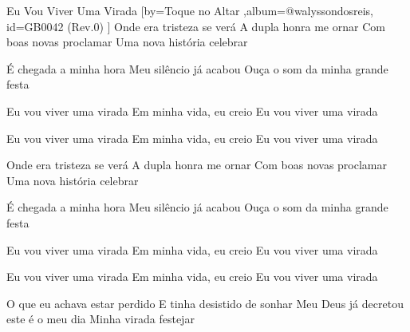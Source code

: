 \beginsong
{Eu Vou Viver Uma Virada %
}[by={Toque no Altar %
},album={@walyssondosreis},
id={GB0042 %
(Rev.0) %
}]
Onde era tristeza se verá
A dupla honra me ornar
Com boas novas proclamar
Uma nova história celebrar

É chegada a minha hora
Meu silêncio já acabou
Ouça o som da minha grande festa

Eu vou viver uma virada
Em minha vida, eu creio
Eu vou viver uma virada

Eu vou viver uma virada
Em minha vida, eu creio
Eu vou viver uma virada

Onde era tristeza se verá
A dupla honra me ornar
Com boas novas proclamar
Uma nova história celebrar

É chegada a minha hora
Meu silêncio já acabou
Ouça o som da minha grande festa

Eu vou viver uma virada
Em minha vida, eu creio
Eu vou viver uma virada

Eu vou viver uma virada
Em minha vida, eu creio
Eu vou viver uma virada

O que eu achava estar perdido
E tinha desistido de sonhar
Meu Deus já decretou este é o meu dia
Minha virada festejar


